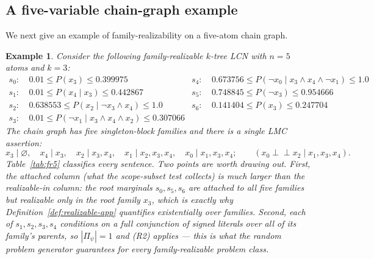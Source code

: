 \documentclass{article} %
\newtheorem{example}{Example}
\newcommand{\indep}{\perp\!\!\!\perp}
\begin{document}
\subsection{A five-variable chain-graph example}\label{sec:fr5}

We next give an example of family-realizability on a five-atom chain graph.

\begin{example}\label{ex:fr5}
Consider the following family-realizable $k$-tree LCN with $n{=}5$ atoms and $k{=}3$:
\begin{align*}
  s_0:&\ 0.01\le P(x_3)\le0.399975 &
  s_4:&\ 0.673756\le P(\lnot x_0\mid x_3\wedge x_4\wedge\lnot x_1)\le1.0\\
  s_1:&\ 0.01\le P(x_4\mid x_3)\le0.442867 &
  s_5:&\ 0.748845\le P(\lnot x_3)\le0.954666\\
  s_2:&\ 0.638553\le P(x_2\mid\lnot x_3\wedge x_4)\le1.0 &
  s_6:&\ 0.141404\le P(x_3)\le0.247704\\
  s_3:&\ 0.01\le P(\lnot x_1\mid x_3\wedge x_4\wedge x_2)\le0.307066
\end{align*}
The chain graph has five singleton-block families and there is a single LMC assertion:
\[
  x_3\mid\varnothing,\quad x_4\mid x_3,\quad x_2\mid x_3,x_4,\quad
  x_1\mid x_2,x_3,x_4,\quad x_0\mid x_1,x_3,x_4;
  \qquad (x_0\indep x_2\mid x_1,x_3,x_4).
\]
Table~\ref{tab:fr5} classifies every sentence. Two points are worth drawing out. First, the
\emph{attached} column (what the scope-subset test collects) is
much larger than the \emph{realizable-in} column: the root marginals $s_0,s_5,s_6$ are attached to
all five families but realizable only in the root family $x_3$, which is exactly why
Definition~\ref{def:realizable-app} quantifies existentially over families. Second, each of
$s_1,s_2,s_3,s_4$ conditions on a \emph{full} conjunction of signed literals over all of its
family's parents, so $|\Pi_\psi|=1$ and (R2) applies --- this is what the random problem generator
guarantees for every family-realizable problem class.


\end{example}
\end{document}
